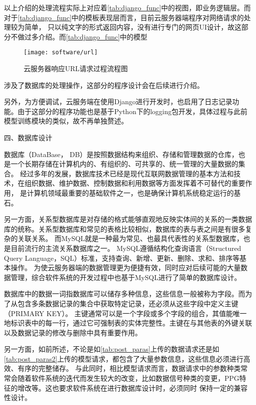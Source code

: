 以上介绍的处理流程实际上对应着\autoref{tab:django_func}中的视图，即业务逻辑层。而对于\autoref{tab:django_func}中的模板表现层而言，目前云服务器端程序对网络请求的处理较为简单，
只以纯文字的形式返回内容，没有进行专门的网页UI设计，故这部分不做过多介绍。而\autoref{tab:django_func}中的模型
\begin{figure}[h]
    \centering
    \texttt{[image: software/url]}
    \caption{\label{fig:url}云服务器响应URL请求过程流程图}
\end{figure}

\noindent
涉及了数据库的处理操作，这部分的程序设计会在后续进行介绍。

另外，为方便调试，云服务端在使用Django进行开发时，也启用了日志记录功能。由于这部分的程序功能也是基于Python下的logging包开发，具体过程与此前模型训练模块的类似，故不再单独赘述。

四、数据库设计

数据库（DataBase， DB）是按照数据结构来组织、存储和管理数据的仓库，也是一个长期存储在计算机内的、有组织的、可共享的、统一管理的大量数据的集合。
经过多年的发展，数据库技术已经是现代互联网数据管理的基本方法和技术，在组织数据、维护数据、控制数据和利用数据等方面发挥着不可替代的重要作用，
是计算机领域最重要的基础软件之一，也是确保计算机系统稳定运行的基石。

另一方面，关系型数据库是对存储的格式能够直观地反映实体间的关系的一类数据库的统称。关系型数据库和常见的表格比较相似，数据库的表与表之间是有很多复杂的关联关系。
而MySQL就是一种最为常见、也最具代表性的关系型数据库，也是目前流行的主流关系数据库之一。
MySQL遵循结构化查询语言（Structured Query Language，SQL）标准，支持查询、新增、更新、删除、求和、排序等基本操作。
为使云服务器端的数据管理更为便捷有效，同时应对后续可能的大量数据管理，综合软件系统的开发过程中也基于MySQL进行了简单的数据库设计。

数据库中的数据一词指数据库可以储存多种信息，这些信息一般被称为字段。而为了从包含多条数据记录的集合中获取特定记录，还必须从这些字段中定义主键（PRIMARY KEY）。
主键通常可以是一个字段或多个字段的组合，其值能唯一地标识表中的每一行，通过它可强制表的实体完整性。主键在与其他表的外键关联以及数据记录的修改与删除中具有重要作用。

另一方面，如前所述，不论是如\autoref{tab:post_paras}上传的数据请求还是如\autoref{tab:post_paras2}上传的模型请求，都包含了大量参数信息，这些信息必须进行高效、有序的完整储存。
与此同时，相比模型请求而言，数据请求中的参数种类常常会随着软件系统的迭代而发生较大的改变，比如数据信号种类的变更，PPG特征的增改等。这也要求软件系统在进行数据库设计时，必须同时
保持一定的兼容性设计。

